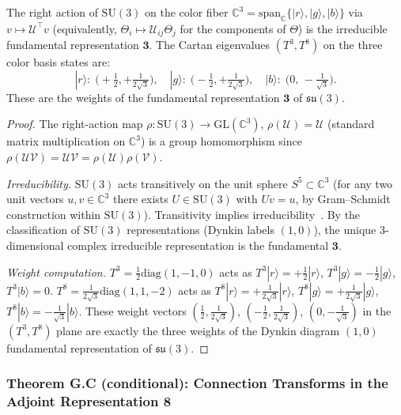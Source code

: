 \begin{tcolorbox}[colback=blue!3!white,colframe=blue!40!black,title=Proposition G.B (conditional on the carrier identification)]
The right action of $\mathrm{SU}(3)$ on the color fiber
$\mathbb{C}^3 = \mathrm{span}_\mathbb{C}\{|r\rangle,|g\rangle,|b\rangle\}$
via $v\mapsto \mathcal{U}^\top v$ (equivalently, $\Theta_i\mapsto \mathcal{U}_{ij}\Theta_j$ for the
components of $\Theta$) is the irreducible fundamental representation $\mathbf{3}$.
The Cartan eigenvalues $(T^3,T^8)$ on the three color basis states are:
\[
|r\rangle:\;\bigl(+\tfrac{1}{2},+\tfrac{1}{2\sqrt{3}}\bigr),\quad
|g\rangle:\;\bigl(-\tfrac{1}{2},+\tfrac{1}{2\sqrt{3}}\bigr),\quad
|b\rangle:\;\bigl(0,\,-\tfrac{1}{\sqrt{3}}\bigr).
\]
These are the weights of the fundamental representation $\mathbf{3}$ of $\mathfrak{su}(3)$.
\end{tcolorbox}

\begin{proof}
The right-action map $\rho:\mathrm{SU}(3)\to\mathrm{GL}(\mathbb{C}^3)$,
$\rho(\mathcal{U}) = \mathcal{U}$ (standard matrix multiplication on $\mathbb{C}^3$)
is a group homomorphism since $\rho(\mathcal{U}\mathcal{V})=\mathcal{U}\mathcal{V}=\rho(\mathcal{U})\rho(\mathcal{V})$.

\emph{Irreducibility.}
$\mathrm{SU}(3)$ acts transitively on the unit sphere $S^5\subset\mathbb{C}^3$ (for any two unit
vectors $u,v\in\mathbb{C}^3$ there exists $U\in\mathrm{SU}(3)$ with $Uv=u$, by Gram–Schmidt
construction within $\mathrm{SU}(3)$).  Transitivity implies irreducibility~\cite{bröcker2003representations}.
By the classification of $\mathrm{SU}(3)$ representations (Dynkin labels $(1,0)$), the unique
3-dimensional complex irreducible representation is the fundamental $\mathbf{3}$.

\emph{Weight computation.}
$T^3=\frac{1}{2}\mathrm{diag}(1,-1,0)$ acts as $T^3|r\rangle=+\frac{1}{2}|r\rangle$,
$T^3|g\rangle=-\frac{1}{2}|g\rangle$, $T^3|b\rangle=0$.
$T^8=\frac{1}{2\sqrt{3}}\mathrm{diag}(1,1,-2)$ acts as
$T^8|r\rangle=+\frac{1}{2\sqrt{3}}|r\rangle$,
$T^8|g\rangle=+\frac{1}{2\sqrt{3}}|g\rangle$,
$T^8|b\rangle=-\frac{1}{\sqrt{3}}|b\rangle$.
These weight vectors $(\frac{1}{2},\frac{1}{2\sqrt{3}})$, $(-\frac{1}{2},\frac{1}{2\sqrt{3}})$,
$(0,-\frac{1}{\sqrt{3}})$ in the $(T^3,T^8)$ plane are exactly the three weights
of the Dynkin diagram $(1,0)$ fundamental representation of $\mathfrak{su}(3)$.
\end{proof}

\subsubsection*{Theorem G.C (conditional): Connection Transforms in the Adjoint Representation $\mathbf{8}$}

